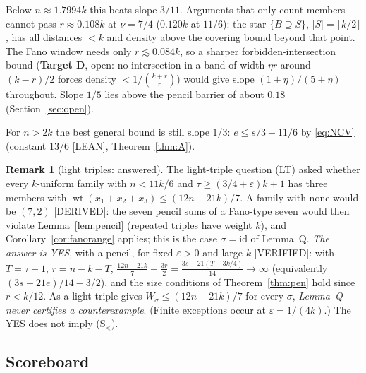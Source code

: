 \documentclass[11pt]{article}
\theoremstyle{definition}
\newtheorem{remark}[theorem]{Remark}
\newcommand{\st}[1]{\textsf{\small[#1]}}
\newcommand{\wt}{\operatorname{wt}}
\begin{document}
Below $n\approx1.7994k$ this beats slope $3/11$. Arguments that only count members cannot pass $r\approx0.108k$ at
$\nu=7/4$ ($0.120k$ at $11/6$): the star $\{B\supseteq S\}$, $|S|=\lceil k/2\rceil$, has all distances $<k$ and density
above the covering bound beyond that point. The Fano window needs only $r\lesssim0.084k$, so a sharper
forbidden-intersection bound (\textbf{Target D}, open: no intersection in a band of width $\eta r$ around $(k-r)/2$
forces density $<1/\binom{k+r}r$) would give slope $(1+\eta)/(5+\eta)$ throughout. Slope $1/5$ lies above the pencil
barrier of about $0.18$ (Section~\ref{sec:open}).

For $n>2k$ the best general bound is still slope $1/3$: $e\le s/3+11/6$ by \eqref{eq:NCV} (constant $13/6$
\st{LEAN}, Theorem~\ref{thm:A}).

\begin{remark}[light triples: answered]\label{rem:LT}
The light-triple question (LT) asked whether every $k$-uniform family with $n<11k/6$ and $\tau\ge(3/4+\varepsilon)k+1$ has
three members with $\wt(x_1+x_2+x_3)\le(12n-21k)/7$. A family with none would be $(7,2)$ \st{DERIVED}: the seven pencil
sums of a Fano-type seven would then violate Lemma~\ref{lem:pencil} (repeated triples have weight $k$), and
Corollary~\ref{cor:fanorange} applies; this is the case $\sigma=\mathrm{id}$ of Lemma~Q. \emph{The answer is YES}, with a
pencil, for fixed $\varepsilon>0$ and large $k$ \st{VERIFIED}: with $T=\tau-1$, $r=n-k-T$,
$\frac{12n-21k}7-\frac{3r}2=\frac{3s+21(T-3k/4)}{14}\to\infty$ (equivalently $(3s+21e)/14-3/2$), and the size conditions
of Theorem~\ref{thm:pen} hold since $r<k/12$. As a light triple gives $W_\sigma\le(12n-21k)/7$ for every $\sigma$,
\emph{Lemma~Q never certifies a counterexample}. (Finite exceptions occur at $\varepsilon=1/(4k)$.) The YES does not
imply (S$_<$).
\end{remark}

\subsection{Scoreboard}
\end{document}
